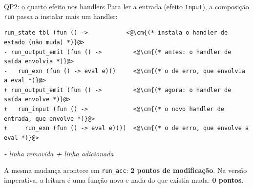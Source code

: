 \documentclass[aspectratio=169,10pt,xcolor={table}]{beamer}
\newcommand{\oc}[1]{\textcolor{marinho}{#1}}
\newcommand{\legenda}[1]{\par\vskip1.5mm{\centering\footnotesize\itshape\color{corpo!85}#1\par}}
\newcommand{\cm}[1]{\textcolor{comentario}{\itshape #1}}
\begin{document}
\begin{frame}[fragile]{QP2: o quarto efeito nos handlers}
  Para ler a entrada (efeito \texttt{Input}), a composição \texttt{run} passa a instalar mais um handler:
  \vskip3mm
\begin{lstlisting}[language=DiffTCC]
  run_state tbl (fun () ->           <@\cm{(* instala o handler de estado (não muda) *)}@>
- run_output_emit (fun () ->         <@\cm{(* antes: o handler de saída envolvia *)}@>
-   run_exn (fun () -> eval e)))     <@\cm{(* o de erro, que envolvia a eval *)}@>
+ run_output_emit (fun () ->         <@\cm{(* agora: o handler de saída envolve *)}@>
+   run_input (fun () ->             <@\cm{(* o novo handler de entrada, que envolve *)}@>
+     run_exn (fun () -> eval e))))  <@\cm{(* o de erro, que envolve a eval *)}@>
\end{lstlisting}
\legenda{\textcolor{rosa}{\textbf{-}} linha removida \qquad \textcolor{verdeazul}{\textbf{+}} linha adicionada}
  \vskip2mm
  {\small A mesma mudança acontece em \texttt{run\_acc}: \oc{\textbf{2 pontos de modificação}}. Na versão imperativa, a leitura é uma função nova e nada do que existia muda: \textbf{0 pontos}.\par}
\end{frame}
\end{document}
